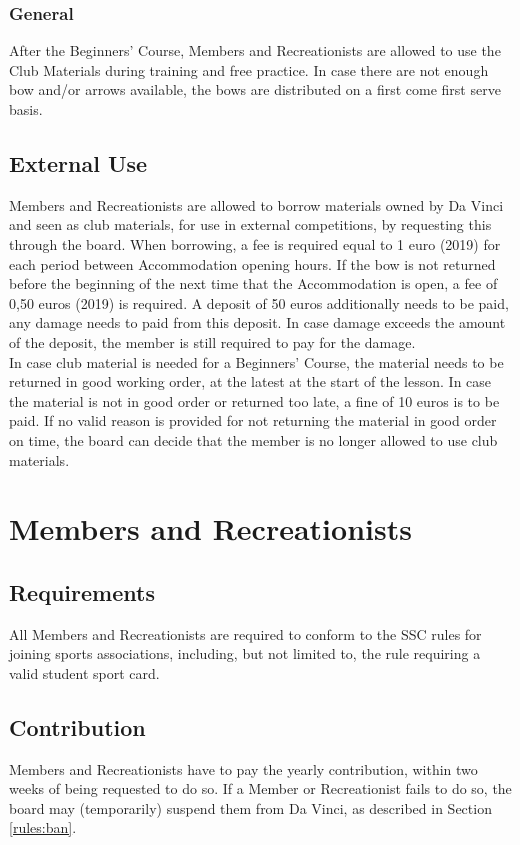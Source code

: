 \documentclass[a4paper]{article}
\begin{document}
\subsubsection{General}
After the { Beginners' Course}, { Members} and { Recreationists} are allowed to use the Club Materials during training and free practice. In case there are not enough bow and/or arrows available, the bows are distributed on a first come first serve basis.

\subsection{External Use}
{ Members} and { Recreationists} are allowed to borrow materials owned by Da Vinci and seen as { club materials}, for use in external competitions, by requesting this through the board. When borrowing, a fee is required equal to 1 euro {\g (2019)} for each period between { Accommodation} opening hours. If the bow is not returned before the beginning of the next time that the { Accommodation} is open, a fee of 0,50 euros {\g (2019)} is required. A deposit of 50 euros additionally needs to be paid, any damage needs to paid from this deposit. In case damage exceeds the amount of the deposit, the member is still required to pay for the damage. \\

In case { club material} is needed for a { Beginners' Course}, the material needs to be returned in good working order, at the latest at the start of the lesson. In case the material is not in good order or returned too late, a fine of 10 euros is to be paid. If no valid reason is provided for not returning the material in good order on time, the board can decide that the member is no longer allowed to use { club materials}.

\section{Members and Recreationists}
\subsection{Requirements}
All { Members} and { Recreationists} are required to conform to the { SSC} rules for joining sports associations, including, but not limited to, the rule requiring a valid student sport card.

\subsection{Contribution}
{ Members} and { Recreationists} have to pay the yearly contribution, within two weeks of being requested to do so. If a { Member} or { Recreationist} fails to do so, the board may (temporarily) suspend them from Da Vinci, as described in Section \ref{rules:ban}. \\
\end{document}
